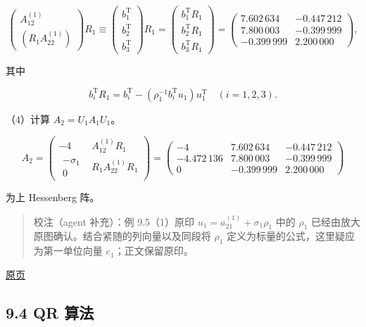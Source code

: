 \documentclass[
  10pt,
  fontset=fandol]{ctexart}
\begin{document}
\[
\begin{pmatrix}A_{12}^{(1)}\\(R_1A_{22}^{(1)})\end{pmatrix}R_1
\equiv\begin{pmatrix}b_1^{\mathrm T}\\b_2^{\mathrm T}\\b_3^{\mathrm T}\end{pmatrix}R_1
=\begin{pmatrix}b_1^{\mathrm T}R_1\\b_2^{\mathrm T}R_1\\b_3^{\mathrm T}R_1\end{pmatrix}
=\begin{pmatrix}
7.602\,634&-0.447\,212\\
7.800\,003&-0.399\,999\\
-0.399\,999&2.200\,000
\end{pmatrix},
\]

其中

\[
b_i^{\mathrm T}R_1=b_i^{\mathrm T}-(\rho_1^{-1}b_i^{\mathrm T}u_1)u_1^{\mathrm T}
\quad(i=1,2,3).
\]

（4）计算 \(A_2=U_1A_1U_1\)。

\[
A_2=\begin{pmatrix}-4&A_{12}^{(1)}R_1\\
\begin{matrix}-\sigma_1\\0\end{matrix}&R_1A_{22}^{(1)}R_1
\end{pmatrix}
=\begin{pmatrix}
-4&7.602\,634&-0.447\,212\\
-4.472\,136&7.800\,003&-0.399\,999\\
0&-0.399\,999&2.200\,000
\end{pmatrix}
\]

为上 Hessenberg 阵。

\begin{quote}
校注（agent 补充）：例 9.5（1）原印 \(u_1=a_{21}^{(1)}+\sigma_1\rho_1\) 中的 \(\rho_1\) 已经由放大原图确认。结合紧随的列向量以及同段将 \(\rho_1\) 定义为标量的公式，这里疑应为第一单位向量 \(e_1\)；正文保留原印。
\end{quote}

\href{../../source-images/pdf-250.jpeg}{原页}

\subsection{9.4 QR 算法}\label{qr-ux7b97ux6cd5}
\end{document}
